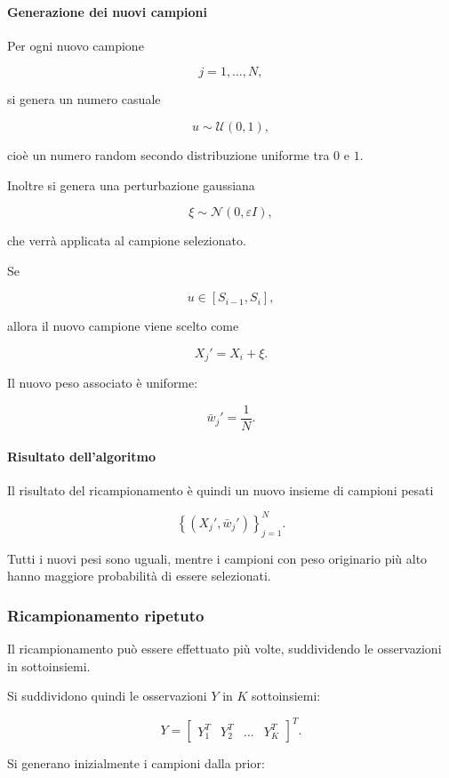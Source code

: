 \documentclass[11pt,a4paper]{article}
\begin{document}
\paragraph{Generazione dei nuovi campioni}

Per ogni nuovo campione

\[
j=1,\dots,N,
\]

si genera un numero casuale

\[
u\sim \mathcal U(0,1),
\]

cioè un numero random secondo distribuzione uniforme tra \(0\) e \(1\).

Inoltre si genera una perturbazione gaussiana

\[
\xi \sim \mathcal N(0,\varepsilon I),
\]

che verrà applicata al campione selezionato.

Se

\[
u\in [S_{i-1},S_i],
\]

allora il nuovo campione viene scelto come

\[
X_j'=X_i+\xi.
\]

Il nuovo peso associato è uniforme:

\[
\bar w_j'=\frac{1}{N}.
\]

\paragraph{Risultato dell'algoritmo}

Il risultato del ricampionamento è quindi un nuovo insieme di campioni pesati

\[
\left\{(X_j',\bar w_j')\right\}_{j=1}^{N}.
\]

Tutti i nuovi pesi sono uguali, mentre i campioni con peso originario più alto hanno maggiore probabilità di essere selezionati.

\subsubsection*{Ricampionamento ripetuto}

Il ricampionamento può essere effettuato più volte, suddividendo le osservazioni in sottoinsiemi.

Si suddividono quindi le osservazioni \(Y\) in \(K\) sottoinsiemi:

\[
Y=
\begin{bmatrix}
Y_1^T & Y_2^T & \dots & Y_K^T
\end{bmatrix}^T.
\]

Si generano inizialmente i campioni dalla prior:
\end{document}
